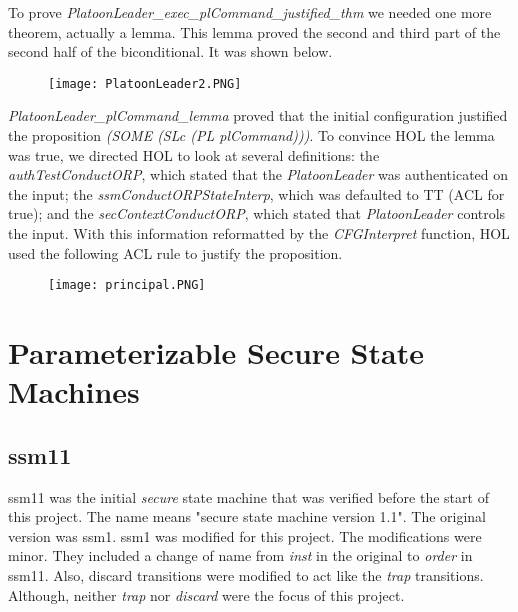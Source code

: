 To prove \emph{PlatoonLeader_exec_plCommand_justified_thm} we needed one more theorem, actually a lemma.  This lemma proved the second and third part of the second half of the biconditional.  It was shown below.\\
  
  \begin{figure}[h]
  \centering
  \texttt{[image: PlatoonLeader2.PNG]}
\end{figure}

\emph{PlatoonLeader_plCommand_lemma} proved that the initial configuration justified the proposition \emph{(SOME (SLc (PL plCommand)))}.  To convince HOL the lemma was true, we directed HOL to look at several definitions: the \emph{authTestConductORP}, which stated that the \emph{PlatoonLeader} was authenticated on the input; the \emph{ssmConductORPStateInterp}, which was defaulted to TT (ACL for true); and the \emph{secContextConductORP}, which stated that \emph{PlatoonLeader} controls the input.  With this information reformatted by the \emph{CFGInterpret} function, HOL used the following ACL rule to justify the proposition.\\
  
  \begin{figure}[h]
  \centering
  \texttt{[image: principal.PNG]}
\end{figure}



\section{Parameterizable Secure State Machines}
\label{sec:param-secure-state}


\subsection{ssm11}
\label{sec:ssm11-1}

ssm11 was the initial \emph{secure} state machine that was verified before the start of this project.  The name means "secure state machine version 1.1".  The original version was ssm1.  ssm1 was modified for this project.  The modifications were minor.  They included a change of name from \emph{inst} in the original to \emph{order} in ssm11.  Also, discard transitions were modified to act like the \emph{trap} transitions.  Although, neither \emph{trap} nor \emph{discard} were the focus of this project. \\
  
